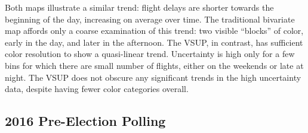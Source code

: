 Both maps illustrate a similar trend: flight delays are shorter towards the beginning of the day, increasing on average over time. The traditional bivariate map affords only a coarse examination of this trend: two visible ``blocks'' of color, early in the day, and later in the afternoon. The VSUP, in contrast, has sufficient color resolution to show a quasi-linear trend. Uncertainty is high only for a few bins for which there are small number of flights, either on the weekends or late at night. The VSUP does not obscure any significant trends in the high uncertainty data, despite having fewer color categories overall.




\subsection{2016 Pre-Election Polling}

